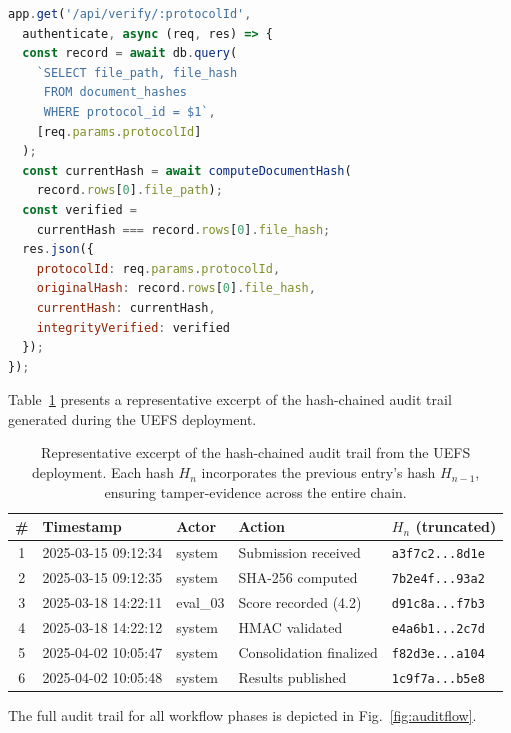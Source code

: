 \documentclass[preprint,12pt,a4paper]{elsarticle}
\begin{document}
\begin{lstlisting}[language=JavaScript, caption={Document integrity verification endpoint. Compares the stored hash against a freshly computed hash to detect post-submission modification.}, label=lst:verify]
app.get('/api/verify/:protocolId',
  authenticate, async (req, res) => {
  const record = await db.query(
    `SELECT file_path, file_hash
     FROM document_hashes
     WHERE protocol_id = $1`,
    [req.params.protocolId]
  );
  const currentHash = await computeDocumentHash(
    record.rows[0].file_path);
  const verified =
    currentHash === record.rows[0].file_hash;
  res.json({
    protocolId: req.params.protocolId,
    originalHash: record.rows[0].file_hash,
    currentHash: currentHash,
    integrityVerified: verified
  });
});
\end{lstlisting}

Table~\ref{tab:auditsample} presents a representative excerpt of the hash-chained audit trail generated during the UEFS deployment.

\begin{table}[H]
\centering
\footnotesize
\begin{tabular}{|c|l|l|l|l|}
\hline
\textbf{\#} & \textbf{Timestamp} & \textbf{Actor} & \textbf{Action} & \textbf{$H_n$ (truncated)} \\
\hline
1 & 2025-03-15 09:12:34 & system & Submission received & \texttt{a3f7c2...8d1e} \\
\hline
2 & 2025-03-15 09:12:35 & system & SHA-256 computed & \texttt{7b2e4f...93a2} \\
\hline
3 & 2025-03-18 14:22:11 & eval\_03 & Score recorded (4.2) & \texttt{d91c8a...f7b3} \\
\hline
4 & 2025-03-18 14:22:12 & system & HMAC validated & \texttt{e4a6b1...2c7d} \\
\hline
5 & 2025-04-02 10:05:47 & system & Consolidation finalized & \texttt{f82d3e...a104} \\
\hline
6 & 2025-04-02 10:05:48 & system & Results published & \texttt{1c9f7a...b5e8} \\
\hline
\end{tabular}
\caption{Representative excerpt of the hash-chained audit trail from the UEFS deployment. Each hash $H_n$ incorporates the previous entry's hash $H_{n-1}$, ensuring tamper-evidence across the entire chain.}
\label{tab:auditsample}
\end{table}

The full audit trail for all workflow phases is depicted in Fig.~\ref{fig:auditflow}.
\end{document}
